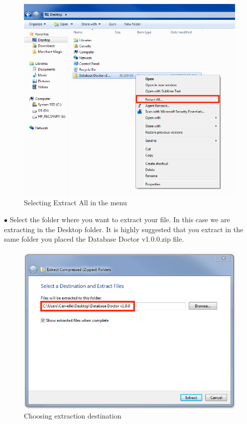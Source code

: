\documentclass[a4paper, 11pt]{article}
\begin{document}
\begin{figure}[h]
    \centering
    \includegraphics[width=\textwidth]{capture 2}
    \caption{Selecting Extract All in the menu}
\end{figure}
\vspace*{\fill}

\pagebreak

\vspace*{\fill}
$\bullet$ Select the folder where you want to extract your file. In this case we are extracting in the Desktop folder. It is highly suggested that you extract in the same folder you placed the Database Doctor v1.0.0.zip file.

\begin{figure}[h]
    \centering
    \includegraphics[width=\textwidth]{capture 3}
    \caption{Choosing extraction destination}
\end{figure}
\vspace*{\fill}
\end{document}
